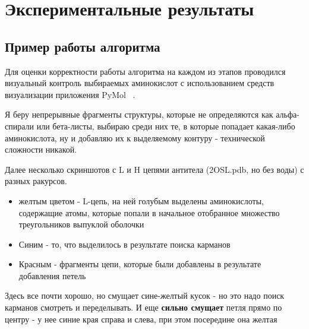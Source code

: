 \graphicspath{{../images/algorithm/}}
\chapter{Экспериментальные результаты}
\section{Пример работы алгоритма}
Для оценки корректности работы алгоритма на каждом из этапов проводился визуальный контроль выбираемых аминокислот с использованием средств визуализации приложения PyMol ~\cite{pymol}.

Я беру непрерывные фрагменты структуры, которые не определяются как альфа-спирали или бета-листы, выбираю среди них те, в которые попадает какая-либо аминокислота, ну и добавляю их к выделяемому контуру - технической сложности никакой.

Далее несколько скриншотов с L и H цепями антитела (2OSL.pdb, но без воды) с разных ракурсов.
\begin{itemize}

\item желтым цветом - L-цепь, на ней голубым выделены аминокислоты, содержащие атомы, которые попали в начальное отобранное множество треугольников выпуклой оболочки

\item Синим - то, что выделилось в результате поиска карманов

\item Красным - фрагменты цепи, которые были добавлены в результате добавления петель

\end{itemize}

Здесь все почти хорошо, но смущает сине-желтый кусок - но это надо поиск карманов смотреть и переделывать. И еще \textbf{сильно смущает} петля прямо по центру - у нее синие края справа и слева, при этом посередине она желтая


